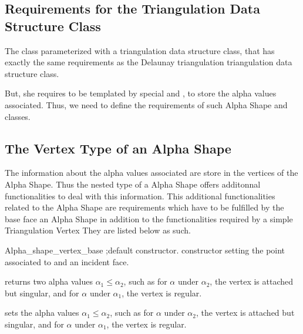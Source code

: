 \subsection{Requirements for the Triangulation Data Structure Class}

The class  parameterized with a
triangulation data structure class, that has exactly the same
requirements as the Delaunay triangulation triangulation data
structure class. 

But, she requires to be templated by special  and
, to store the alpha values associated. Thus, we need to
define the requirements of such Alpha Shape  and
 classes.

\subsection{The Vertex Type of an Alpha Shape\label{I1_SectVertex}}

The information about the alpha values associated  are store in the 
vertices of the Alpha Shape. Thus the nested 
type of a Alpha Shape offers additonnal functionalities to deal with this information.
This additional functionalities related to the Alpha Shape
are requirements which have to be fulfilled
by the base face  an Alpha Shape
in addition to the functionalities required by a simple Triangulation Vertex
They are listed below as such.



\begin{ccClass}{Alpha_shape_vertex_base}
\ccCreation
{};{default constructor.}
\ccGlue
{}
\ccGlue
{} 
{constructor setting the point  associated to and an incident face.}

{returns two alpha values $\alpha_1 \leq \alpha_2$, such as for
$\alpha$ under $\alpha_2$, the vertex is attached but singular, and
for $\alpha$ under $\alpha_1$, the vertex is regular.}


\ccModifiers
{}
{sets the alpha values $\alpha_1 \leq \alpha_2$, such as for
$\alpha$ under $\alpha_2$, the vertex is attached but singular, and
for $\alpha$ under $\alpha_1$, the vertex is regular.}
\end{ccClass}


